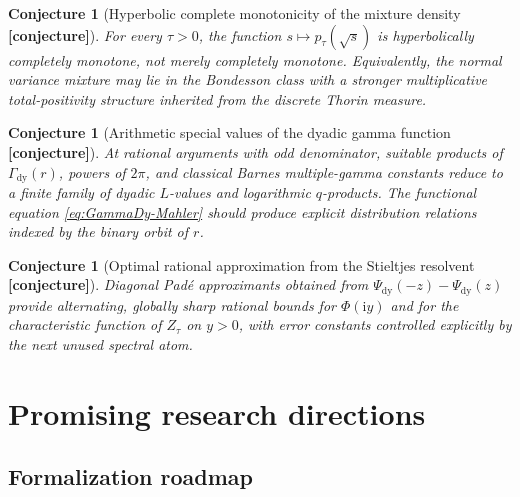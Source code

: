 \documentclass[11pt,oneside]{article}
\newtheorem{conjecture}[theorem]{Conjecture}
\theoremstyle{definition}
\theoremstyle{remark}
\newcommand{\ii}{\mathrm i}
\newcommand{\GammaDy}{\Gamma_{\!\mathrm{dy}}}
\newcommand{\Conj}{\textcolor{deepred}{\textbf{[conjecture]}}}
\begin{document}
\begin{conjecture}[Hyperbolic complete monotonicity of the mixture density \Conj]
For every $\tau>0$, the function $s\mapsto p_\tau(\sqrt s)$ is hyperbolically completely
monotone, not merely completely monotone.  Equivalently, the normal variance mixture may lie
in the Bondesson class with a stronger multiplicative total-positivity structure inherited
from the discrete Thorin measure.
\end{conjecture}

\begin{conjecture}[Arithmetic special values of the dyadic gamma function \Conj]
At rational arguments with odd denominator, suitable products of
$\GammaDy(r)$, powers of $2\pi$, and classical Barnes multiple-gamma constants reduce to a
finite family of dyadic $L$-values and logarithmic $q$-products.  The functional equation
\eqref{eq:GammaDy-Mahler} should produce explicit distribution relations indexed by the
binary orbit of $r$.
\end{conjecture}

\begin{conjecture}[Optimal rational approximation from the Stieltjes resolvent \Conj]
Diagonal Pad\'e approximants obtained from
\(
 \Psi_{\mathrm{dy}}(-z)-\Psi_{\mathrm{dy}}(z)
\)
provide alternating, globally sharp rational bounds for $\Phi(\ii y)$ and for the
characteristic function of $Z_\tau$ on $y>0$, with error constants controlled explicitly by
the next unused spectral atom.
\end{conjecture}

\section{Promising research directions}
\label{sec:future}

\subsection{Formalization roadmap}
\end{document}

